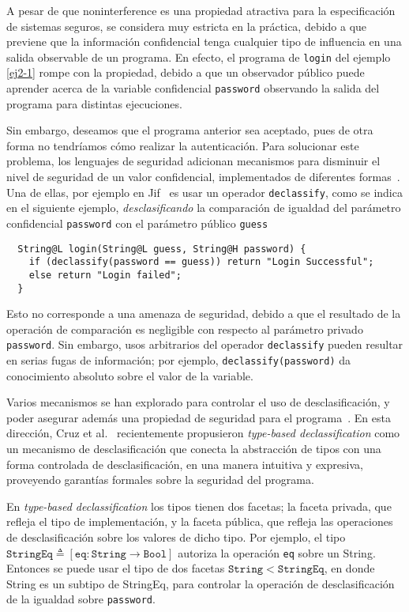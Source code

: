 A pesar de que noninterference es una propiedad atractiva para la especificación de sistemas seguros, se considera muy estricta en la práctica, debido a que previene que la información confidencial tenga cualquier tipo de influencia en una salida observable de un programa. En efecto, el programa de \texttt{login} del ejemplo \ref{ej2-1} rompe con la propiedad, debido a que un observador público puede aprender acerca de la variable confidencial \texttt{password} observando la salida del programa para distintas ejecuciones.

Sin embargo, deseamos que el programa anterior sea aceptado, pues de otra forma no tendríamos cómo realizar la autenticación. Para solucionar este problema, los lenguajes de seguridad adicionan mecanismos para disminuir el nivel de seguridad de un valor confidencial, implementados de diferentes formas~\cite{sabelfeldSands:JCS09}. Una de ellas, por ejemplo en Jif~\cite{jif} es usar un operador \texttt{declassify}, como se indica en el siguiente ejemplo, \emph{desclasificando} la comparación de igualdad del parámetro confidencial \texttt{password} con el parámetro público \texttt{guess}

\begin{lstlisting}
  String@L login(String@L guess, String@H password) {
    if (declassify(password == guess)) return "Login Successful";
    else return "Login failed";
  }
\end{lstlisting}

Esto no corresponde a una amenaza de seguridad, debido a que el resultado de la operación de comparación es negligible con respecto al parámetro privado \texttt{password}. Sin embargo, usos arbitrarios del operador \texttt{declassify} pueden resultar en serias fugas de información; por ejemplo, \texttt{declassify(password)} da conocimiento absoluto sobre el valor de la variable.

Varios mecanismos se han explorado para controlar el uso de desclasificación, y poder asegurar además una propiedad de seguridad para el programa~\cite{sabelfeldSands:JCS09}. En esta dirección, Cruz et al.~\cite{cruzAl:ecoop2017} recientemente propusieron \textit{type-based declassification} como un mecanismo de desclasificación que conecta la abstracción de tipos con una forma controlada de desclasificación, en una manera intuitiva y expresiva, proveyendo garantías formales sobre la seguridad del programa.

En \textit{type-based declassification} los tipos tienen dos facetas; la faceta privada, que refleja el tipo de implementación, y la faceta pública, que refleja las operaciones de desclasificación sobre los valores de dicho tipo. Por ejemplo, el tipo $\mathtt{StringEq} \triangleq [\mathtt{eq} : \mathtt{String} \rightarrow \mathtt{Bool}]$ autoriza la operación \texttt{eq} sobre un String. Entonces se puede usar el tipo de dos facetas $\mathtt{String} < \mathtt{StringEq}$, en donde String es un subtipo de StringEq, para controlar la operación de desclasificación de la igualdad sobre \texttt{password}.

